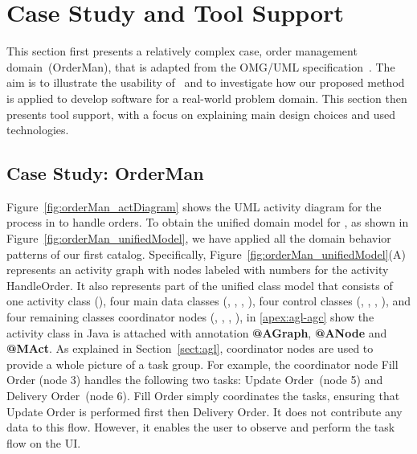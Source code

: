 \section{Case Study and Tool Support}
\label{sect:caseStudyToolSupport} %

This section first presents a relatively complex case, order management domain~(OrderMan), that is adapted from the OMG/UML specification~\cite[p.~396]{omg_unified_2015}. The aim is to illustrate the usability of \agl~and to investigate how our proposed method is applied to develop software for a real-world problem domain. This section then presents tool support, with a focus on explaining main design choices and used technologies.

\subsection{Case Study: OrderMan}
\label{subsect:caseStudy} %

Figure~\ref{fig:orderMan_actDiagram} shows the UML activity diagram for the process in \orderman to handle orders. To obtain the unified domain model for \orderman, as shown in Figure~\ref{fig:orderMan_unifiedModel}, we have applied 
all the domain behavior patterns of our first catalog. Specifically, Figure~\ref{fig:orderMan_unifiedModel}(A) represents an activity graph with nodes labeled with numbers for the activity HandleOrder. It also represents part of the unified class model 
that consists of one activity class (), four main data classes (, , , ), four control classes (, , , ), and four remaining classes \wrt coordinator nodes (, , , ),
in \ref{apex:agl-agc} show the activity class  in Java is attached with annotation \textbf{@AGraph}, \textbf{@ANode} and \textbf{@MAct}.
As explained in Section~\ref{sect:agl}, coordinator nodes are used to provide a whole picture of a task group. %
For example, the coordinator node Fill Order (node 3) handles the following two tasks: Update Order~(node 5) and Delivery Order~(node 6). %
Fill Order simply coordinates the tasks, ensuring that Update Order is performed first then Delivery Order. It does not contribute any data to this flow. However, it enables the user to observe and perform the task flow on the UI.

